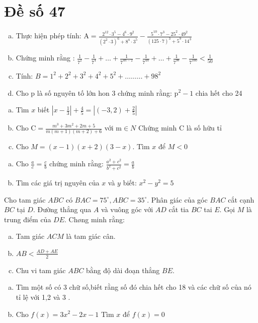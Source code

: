 \section{Đề số 47}

\begin{bt} 
	\hfill
	\begin{enumerate}[a.]
		\item Thực hiện phép tính: $\mathrm{A}=\frac{2^{12} \cdot 3^5-4^6 \cdot 9^2}{\left(2^2 \cdot 3\right)^6+8^4 \cdot 3^5}-\frac{5^{10} \cdot 7^3-25^2 \cdot 49^2}{(125 \cdot 7)^3+5^9 \cdot 14^3}$
		\item Chứng minh rằng : $\frac{1}{7^2}-\frac{1}{7^4}+\ldots+\frac{1}{7^{4 n-2}}-\frac{1}{7^{4 n}}+\ldots+\frac{1}{7^{98}}-\frac{1}{7^{100}}<\frac{1}{50}$
		\item Tính: $B=1^2+2^2+3^2+4^2+5^2+\ldots \ldots \ldots+98^2$
		\item Cho $\mathrm{p}$ là số nguyên tố lớn hon 3 chứng minh rằng: $\mathrm{p}^2-1$ chia hết cho 24
	\end{enumerate}
	\loigiai{} 
\end{bt}

\begin{bt}
	\hfill
	\begin{enumerate}[a.]
		\item Tìm $x$ biết $\left|x-\frac{1}{3}\right|+\frac{4}{5}=\left|(-3,2)+\frac{2}{5}\right|$
		\item Cho $\mathrm{C}=\frac{m^3+3 m^2+2 m+5}{m(m+1)(m+2)+6}$ với $\mathrm{m} \in N$ Chứng minh $\mathrm{C}$ là số hữu tỉ
		\item Cho $M=(x-1)(x+2)(3-x)$. Tìm $x$ để $M<0$
	\end{enumerate}
	\loigiai{} 
\end{bt}

\begin{bt}
	\hfill
	\begin{enumerate}[a.]
		\item Cho $\frac{a}{c}=\frac{c}{b}$ chứng minh rằng: $\frac{a^2+c^2}{b^2+c^2}=\frac{a}{b}$
		\item Tìm các giá trị nguyên của $x$ và $y$ biết: $x^2-y^2=5$
	\end{enumerate}
	
	\loigiai{} 
\end{bt}

\begin{bt}
	Cho tam giác $A B C$ có $B A C=75^{\circ}, A B C=35^{\circ}$. Phân giác của góc $B A C$ cắt cạnh $B C$ tại $D$. Đường thẳng qua $A$ và vuông góc với $A D$ cắt tia $B C$ tai $E$. Gọi $M$ là trung điểm của $D E$. Chøng minh rằng:
	\begin{enumerate}[a.]
		\item Tam giác $A C M$ là tam giác cân.
		\item $A B<\frac{A D+A E}{2}$
		\item Chu vi tam giác $A B C$ bằng độ dài đoạn thẳng $B E$.
	\end{enumerate}
	\loigiai{}
\end{bt}

\begin{bt}
	\hfill
	\begin{enumerate}[a.]
		\item Tìm một số có 3 chữ số,biết rằng số đó chia hết cho 18 và các chữ số của nó tỉ lệ với 1,2 và 3 .
		\item Cho $f(x)=3 x^2-2 x-1$ Tìm $x$ để $f(x)=0$
	\end{enumerate}
	\loigiai{} 
\end{bt}

